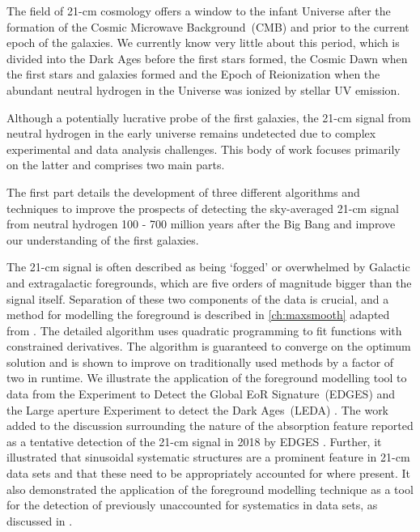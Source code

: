 The field of 21-cm cosmology offers a window to the infant Universe after the formation of the Cosmic Microwave Background~(CMB) and prior to the current epoch of the galaxies. We currently know very little about this period, which is divided into the Dark Ages before the first stars formed, the Cosmic Dawn when the first stars and galaxies formed and the Epoch of Reionization when the abundant neutral hydrogen in the Universe was ionized by stellar UV emission.

Although a potentially lucrative probe of the first galaxies, the 21-cm signal from neutral hydrogen in the early universe remains undetected due to complex experimental and data analysis challenges. This body of work focuses primarily on the latter and comprises two main parts.

The first part details the development of three different algorithms and techniques to improve the prospects of detecting the sky-averaged 21-cm signal from neutral hydrogen 100 - 700 million years after the Big Bang and improve our understanding of the first galaxies.

The 21-cm signal is often described as being `fogged' or overwhelmed by Galactic and extragalactic foregrounds, which are five orders of magnitude bigger than the signal itself. Separation of these two components of the data is crucial, and a method for modelling the foreground is described in \cref{ch:maxsmooth} adapted from \cite{Bevins_maxsmooth_2021}. The detailed algorithm uses quadratic programming to fit functions with constrained derivatives. The algorithm is guaranteed to converge on the optimum solution and is shown to improve on traditionally used methods by a factor of two in runtime. We illustrate the application of the foreground modelling tool to data from the Experiment to Detect the Global EoR Signature~(EDGES) \cite{Bowman_edges_2018} and the Large aperture Experiment to detect the Dark Ages~(LEDA) \cite{Price_LEDA_2018}. The work added to the discussion surrounding the nature of the absorption feature reported as a tentative detection of the 21-cm signal in 2018 by EDGES \cite{Bowman_edges_2018}. Further, it illustrated that sinusoidal systematic structures are a prominent feature in 21-cm data sets and that these need to be appropriately accounted for where present. It also demonstrated the application of the foreground modelling technique as a tool for the detection of previously unaccounted for systematics in data sets, as discussed in \cite{de_lera_acedo_reach_2022}.

